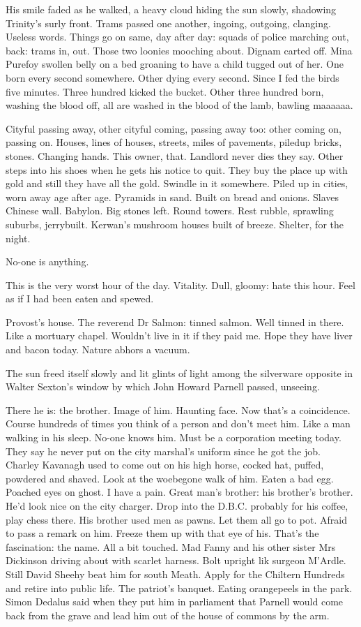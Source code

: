His smile faded as he walked,
a heavy cloud hiding the sun slowly,
shadowing Trinity's surly front.
Trams passed one another,
ingoing,
outgoing,
clanging.
Useless words.
Things go on same,
day after day:
squads of police marching out,
back:
trams in,
out.
Those two loonies
mooching about.
Dignam carted off.
Mina Purefoy swollen belly on a bed
groaning to have a child tugged out of her.
One born every second
somewhere.
Other dying every second.
Since I fed the birds five minutes.
Three hundred kicked the bucket.
Other three hundred born,
washing the
blood off,
all are washed in the blood of the lamb,
bawling maaaaaa.

Cityful passing away,
other cityful coming,
passing away too:
other
coming on,
passing on.
Houses,
lines of houses,
streets,
miles of
pavements,
piledup bricks,
stones.
Changing hands.
This owner,
that.
Landlord never dies they say.
Other steps into his shoes when he gets
his notice to quit.
They buy the place up with gold and still they
have all the gold.
Swindle in it somewhere.
Piled up in cities,
worn
away age after age.
Pyramids in sand.
Built on bread and onions.
Slaves Chinese wall.
Babylon.
Big stones left.
Round towers.
Rest rubble,
sprawling suburbs,
jerrybuilt.
Kerwan's mushroom houses built of breeze.
Shelter,
for the night.

No-one is anything.

This is the very worst hour of the day.
Vitality.
Dull,
gloomy:
hate
this hour.
Feel as if I had been eaten and spewed.

Provost's house.
The reverend Dr Salmon:
tinned salmon.
Well
tinned in there.
Like a mortuary chapel.
Wouldn't live in it if they paid
me.
Hope they have liver and bacon today.
Nature abhors a vacuum.

The sun freed itself slowly and lit glints of light among the silverware
opposite in Walter Sexton's window by which John Howard Parnell passed,
unseeing.

There he is:
the brother.
Image of him.
Haunting face.
Now that's a
coincidence.
Course hundreds of times you think of a person and don't
meet him.
Like a man walking in his sleep.
No-one knows him.
Must be a
corporation meeting today.
They say he never put on the city marshal's
uniform since he got the job.
Charley Kavanagh used to come out on his
high horse,
cocked hat,
puffed,
powdered and shaved.
Look at the
woebegone walk of him.
Eaten a bad egg.
Poached eyes on ghost.
I have a
pain.
Great man's brother:
his brother's brother.
He'd look nice on the
city charger.
Drop into the D.B.C.
probably for his coffee,
play chess
there.
His brother used men as pawns.
Let them all go to pot.
Afraid to
pass a remark on him.
Freeze them up with that eye of his.
That's the
fascination:
the name.
All a bit touched.
Mad Fanny and his other sister
Mrs Dickinson driving about with scarlet harness.
Bolt upright lik
 surgeon M'Ardle.
Still David Sheehy beat him for south Meath.
Apply for the Chiltern Hundreds and retire into public life.
The patriot's
banquet.
Eating orangepeels in the park.
Simon Dedalus said when they put
him in parliament that Parnell would come back from the grave and lead
him out of the house of commons by the arm.

